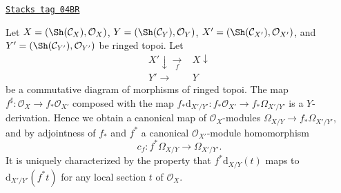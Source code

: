 \begin{lemma}
\label{sites-modules-lemma-functoriality-differentials-ringed-topoi}
\href{https://stacks.math.columbia.edu/tag/04BR}{\texttt{Stacks tag 04BR}}

Let
$X = (\Sh(\mathcal{C}_X), \mathcal{O}_X)$,
$Y = (\Sh(\mathcal{C}_Y), \mathcal{O}_Y)$,
$X' = (\Sh(\mathcal{C}_{X'}), \mathcal{O}_{X'})$, and
$Y' = (\Sh(\mathcal{C}_{Y'}), \mathcal{O}_{Y'})$ be ringed topoi.
Let
$$
\begin{array}{cc}X' \downarrow\underset{f}{\longrightarrow} & X \downarrow \\ Y' \longrightarrow & Y\end{array}
$$
be a commutative diagram of morphisms of ringed topoi. The map
$f^\sharp : \mathcal{O}_X \to f_*\mathcal{O}_{X'}$ composed with the map
$f_*\text{d}_{X'/Y'} : f_*\mathcal{O}_{X'} \to f_*\Omega_{X'/Y'}$ is a
$Y$-derivation. Hence we obtain a canonical map of $\mathcal{O}_X$-modules
$\Omega_{X/Y} \to f_*\Omega_{X'/Y'}$, and by
adjointness of $f_*$ and $f^*$ a
canonical $\mathcal{O}_{X'}$-module homomorphism
$$
c_f : f^*\Omega_{X/Y} \longrightarrow \Omega_{X'/Y'}.
$$
It is uniquely characterized by the property that
$f^*\text{d}_{X/Y}(t)$ maps to $\text{d}_{X'/Y'}(f^* t)$
for any local section $t$ of $\mathcal{O}_X$.
\end{lemma}

